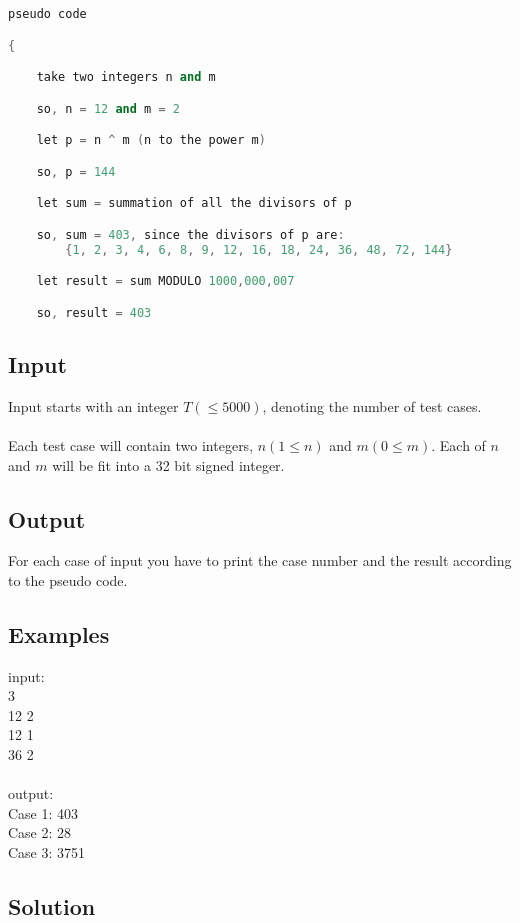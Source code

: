 \documentclass[10pt,a4paper]{article}
\begin{document}
\begin{lstlisting}[language=C++, label={1st:code}, mathescape=true, breaklines=true]
pseudo code

{

    take two integers n and m

    so, n = 12 and m = 2

    let p = n ^ m (n to the power m)

    so, p = 144

    let sum = summation of all the divisors of p

    so, sum = 403, since the divisors of p are:
        {1, 2, 3, 4, 6, 8, 9, 12, 16, 18, 24, 36, 48, 72, 144}

    let result = sum MODULO 1000,000,007

    so, result = 403

\end{lstlisting}


\subsection*{Input}
Input starts with an integer $T (\leq 5000)$, denoting the number of test cases.
\\ \\
Each test case will contain two integers, $n (1 \leq n)$ and $m (0 \leq m)$. Each of $n$ and $m$ will be fit into a 32 bit signed integer.

\subsection*{Output}
For each case of input you have to print the case number and the result according to the pseudo code.

\subsection*{Examples}
input: \\
3\\
12 2\\
12 1\\
36 2\\
\\
output: \\
Case 1: 403 \\
Case 2: 28 \\
Case 3: 3751 

\subsection*{Solution}
\end{document}

